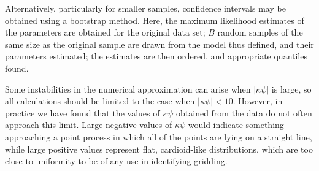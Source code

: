 \documentclass[../../ArchStats.tex]{subfiles}
\begin{document}
Alternatively, particularly for smaller samples, confidence intervals may be obtained using a bootstrap method. Here, the maximum likelihood estimates of the parameters are obtained for the original data set; $B$ random samples of the same size as the original sample are drawn from the model thus defined, and their parameters estimated; the estimates are then ordered, and appropriate quantiles found.

Some instabilities in the numerical approximation can arise when $\vert \kappa \psi \vert$ is large, so all calculations should be limited to the case when $\vert \kappa \psi \vert < 10$. However, in practice we have found that the values of $\kappa \psi$ obtained from the data do not often approach this limit. Large negative values of $\kappa \psi$ would indicate something approaching a point process in which all of the points are lying on a straight line, while large positive values represent flat, cardioid-like distributions, which are too close to uniformity to be of any use in identifying gridding.
\end{document}

